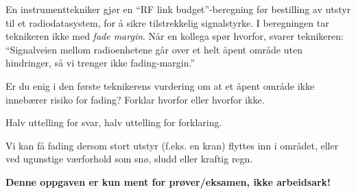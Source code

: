 

En instrumenttekniker gjør en ``RF link budget''-beregning før bestilling av utstyr til et radiodatasystem, for å sikre tilstrekkelig signalstyrke. I beregningen tar teknikeren ikke med {\it fade margin}. Når en kollega spør hvorfor, svarer teknikeren: ``Signalveien mellom radioenhetene går over et helt åpent område uten hindringer, så vi trenger ikke fading-margin.''

\vskip 10pt

Er du enig i den første teknikerens vurdering om at et åpent område ikke innebærer risiko for fading? Forklar hvorfor eller hvorfor ikke.







Halv uttelling for svar, halv uttelling for forklaring.

\vskip 10pt

Vi kan få fading dersom stort utstyr (f.eks. en kran) flyttes inn i området, eller ved ugunstige værforhold som snø, sludd eller kraftig regn.







{\bf Denne oppgaven er kun ment for prøver/eksamen, ikke arbeidsark!}


